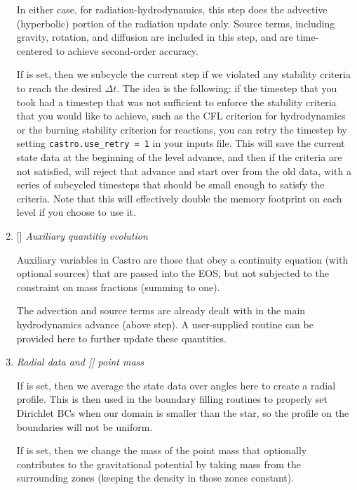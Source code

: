 \begin{enumerate}
\begin{itemize}
  \end{itemize}

  In either case, for radiation-hydrodynamics, this step does the
  advective (hyperbolic) portion of the radiation update only.
  Source terms, including gravity, rotation, and diffusion are
  included in this step, and are time-centered to achieve second-order
  accuracy.

  If  is set, then we subcycle the current
  step if we violated any stability criteria to reach the desired
  $\Delta t$.  The idea is the following: if the timestep that you
  took had a timestep that was not sufficient to enforce the stability
  criteria that you would like to achieve, such as the CFL criterion
  for hydrodynamics or the burning stability criterion for reactions,
  you can retry the timestep by setting {\tt castro.use\_retry = 1} in
  your inputs file. This will save the current state data at the
  beginning of the level advance, and then if the criteria are not
  satisfied, will reject that advance and start over from the old
  data, with a series of subcycled timesteps that should be small
  enough to satisfy the criteria.  Note that this will effectively
  double the memory footprint on each level if you choose to use it.


\item {[]} {\em Auxiliary quantitiy evolution} 

  Auxiliary variables in Castro are those that obey a continuity
  equation (with optional sources) that are passed into the EOS, but
  not subjected to the constraint on mass fractions (summing to one).

  The advection and source terms are already dealt with in the 
  main hydrodynamics advance (above step).  A user-supplied routine
   can be provided here to further update these
  quantities.
  
\item {\em Radial data and {\rm[]} point mass} 

  If  is set, then we average the state data
  over angles here to create a radial profile.  This is then used in the 
  boundary filling routines to properly set Dirichlet BCs when our domain
  is smaller than the star, so the profile on the boundaries will not 
  be uniform.

  If  is set, then we
  change the mass of the point mass that optionally contributes to the
  gravitational potential by taking mass from the surrounding zones
  (keeping the density in those zones constant).


\end{enumerate}

